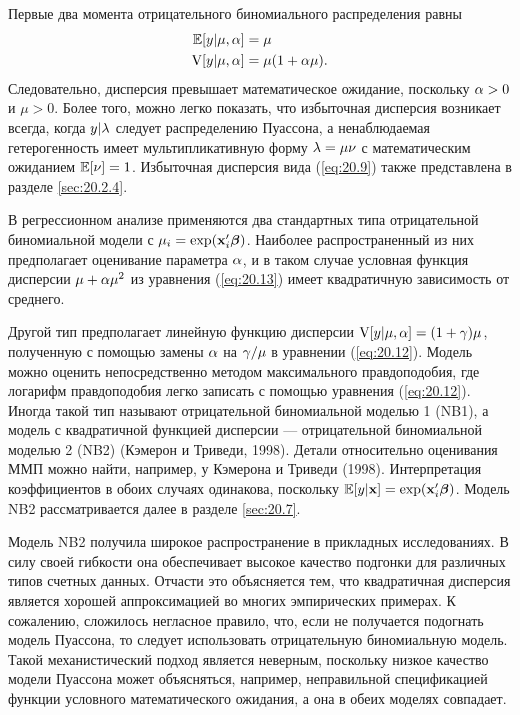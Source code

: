 Первые два момента отрицательного биномиального распределения равны
    \begin{align}\label{eq:20.13}
    \mathbb{E}[y|\mu, \alpha] &= \mu \\
    \mathrm{V}[y|\mu, \alpha] &= \mu(1 + \alpha\mu). \notag
    \end{align}
Следовательно, дисперсия превышает математическое ожидание, поскольку $\alpha > 0$ и $\mu > 0$. Более того, можно легко показать, что избыточная дисперсия возникает всегда, когда $y|\lambda$ следует распределению Пуассона, а ненаблюдаемая гетерогенность имеет мультипликативную форму $\lambda = \mu\nu$ с математическим ожиданием $\mathbb{E}[\nu] = 1$. Избыточная дисперсия вида (\ref{eq:20.9}) также представлена в разделе \ref{sec:20.2.4}.

В регрессионном анализе применяются два стандартных типа отрицательной биномиальной модели с $\mu_i = \exp(\mathbf{x}_i'\bm{\beta})$.
Наиболее распространенный из них предполагает оценивание параметра $\alpha$, и в таком случае условная функция дисперсии $\mu + \alpha \mu ^2$ из уравнения (\ref{eq:20.13}) имеет квадратичную зависимость от среднего.

Другой тип предполагает линейную функцию дисперсии $\mathrm{V}[y|\mu, \alpha] = (1 + \gamma)\mu$, полученную с помощью замены $\alpha$ на $\gamma/\mu$ в уравнении (\ref{eq:20.12}). Модель можно оценить непосредственно методом максимального правдоподобия, где логарифм правдоподобия легко записать с помощью уравнения (\ref{eq:20.12}). Иногда такой тип называют отрицательной биномиальной моделью 1 (NB1), а модель с квадратичной функцией дисперсии --- отрицательной биномиальной моделью 2 (NB2) (Кэмерон и Триведи, 1998). Детали относительно оценивания ММП можно найти, например, у Кэмерона и Триведи (1998). Интерпретация коэффициентов в обоих случаях одинакова, поскольку $\mathbb{E}[y|\mathbf{x}] = \exp(\mathbf{x}_i'\bm{\beta})$. Модель NB2 рассматривается далее в разделе \ref{sec:20.7}.

Модель NB2 получила широкое распространение в прикладных исследованиях. В силу своей гибкости она обеспечивает высокое качество подгонки для различных типов счетных данных. Отчасти это объясняется тем, что квадратичная дисперсия является хорошей аппроксимацией во многих эмпирических примерах. К сожалению, сложилось негласное правило, что, если не получается подогнать модель Пуассона, то следует использовать отрицательную биномиальную модель. Такой механистический подход является неверным, поскольку низкое качество модели Пуассона может объясняться, например, неправильной спецификацией функции условного математического ожидания, а она в обеих моделях совпадает.

